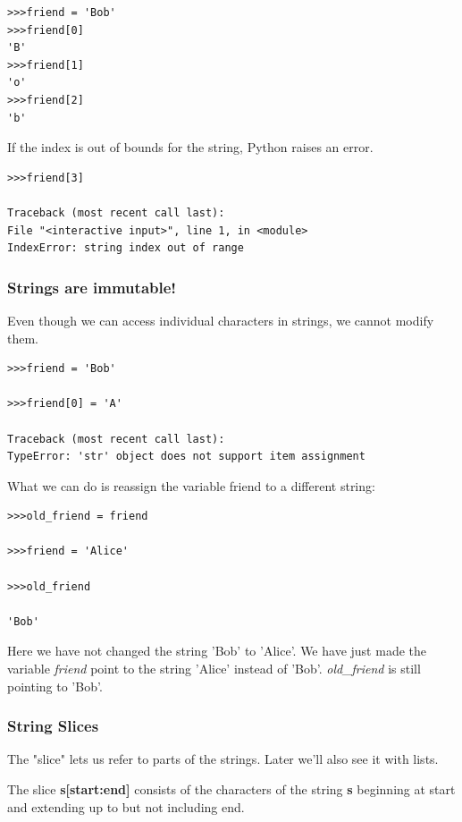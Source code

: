 \documentclass{article}
\begin{document}
\begin{lstlisting}
>>>friend = 'Bob'
>>>friend[0] 
'B'
>>>friend[1]
'o'
>>>friend[2]
'b' 

\end{lstlisting}

If the index is out of bounds for the string, Python raises an error.

\begin{lstlisting}
>>>friend[3]
 
Traceback (most recent call last):   
File "<interactive input>", line 1, in <module>
IndexError: string index out of range 
\end{lstlisting}

\subsubsection{Strings are immutable!}
Even though we can access individual characters in strings, we cannot modify them.  

\begin{lstlisting}
>>>friend = 'Bob'

>>>friend[0] = 'A'

Traceback (most recent call last):
TypeError: 'str' object does not support item assignment
\end{lstlisting}

What we can do is reassign the variable friend to a different string:
\begin{lstlisting}
>>>old_friend = friend

>>>friend = 'Alice'

>>>old_friend

'Bob'
\end{lstlisting}

Here we have not changed the string 'Bob' to 'Alice'.  We have just made the variable \textit{friend} point to the string 'Alice' instead of 'Bob'.  \textit{old{\_}friend} is still pointing to 'Bob'.

\subsubsection{String Slices}
The "slice" lets us refer to parts of the strings.  Later we'll also see it with lists.

The slice \textbf{s[start:end]} consists of the characters of the string \textbf{s} beginning at start and extending up to but not including end.\\
\end{document}
